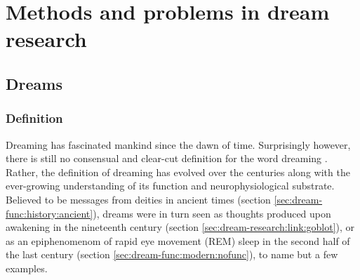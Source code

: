 \cleardoublepage

\chapter{Methods and problems in dream research}
\label{sec:dream-research}


\section{Dreams}
\label{sec:dream-research:dreams}

\subsection{Definition}
\label{sec:dream-research:dreams:definition}

Dreaming has fascinated mankind since the dawn of time. Surprisingly however, there is still no consensual and clear-cut definition for the word dreaming \citep{pagel_definitions_2001}. Rather, the definition of dreaming has evolved over the centuries along with the ever-growing understanding of its function and neurophysiological substrate. Believed to be messages from deities in ancient times (section \ref{sec:dream-func:history:ancient}), dreams were in turn seen as thoughts produced upon awakening in the nineteenth century (section \ref{sec:dream-research:link:goblot}), or as an epiphenomenom of rapid eye movement (REM) sleep in the second half of the last century (section \ref{sec:dream-func:modern:nofunc}), to name but a few examples.

